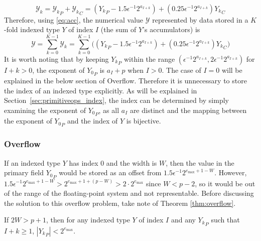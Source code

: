       \begin{equation}
        \mathcal{Y}_k = {\mathcal{Y}_k}_P + {\mathcal{Y}_k}_C = ({Y_k}_P - 1.5 \epsilon^{-1}2^{a_{I + k}}) + (0.25\epsilon^{-1}2^{a_{I + k}}){Y_k}_C
        \label{eq:acc}
      \end{equation}
      Therefore, using  \eqref{eq:acc}, the numerical value $\mathcal{Y}$ represented by data stored in a $K$-fold indexed type $Y$ of index $I$ (the sum of $Y$'s accumulators) is
      \begin{equation}
        \mathcal{Y} = \sum\limits_{k = 0}^{K - 1} \mathcal{Y}_k = \sum\limits_{k = 0}^{K - 1} \bigl(({Y_k}_P - 1.5 \epsilon^{-1}2^{a_{I + k}}) + (0.25\epsilon^{-1}2^{a_{I + k}}){Y_k}_C\bigr)
        \label{eq:indexedvalue}
      \end{equation}
      It is worth noting that by keeping ${Y_k}_P$ within the range
      \(
      	(\epsilon^{-1} 2^{a_{I + k}}, 2 \epsilon^{-1} 2^{a_{I + k}})
      \)
      for $I+k > 0$, the exponent of ${Y_0}_P$ is $a_I + p$ when $I > 0$.
      The case of $I = 0$ will be explained in the below section of Overflow.
      Therefore it is unnecessary to store the index of an indexed type explicitly.
      As will be explained in
      Section~\ref{sec:primitiveops_index}, the index can be determined by
      simply examining the exponent of ${Y_0}_P$, as all $a_I$ are distinct and
      the mapping between the exponent of ${Y_0}_P$ and the index of $Y$ is
      bijective.

    \subsubsection{Overflow}
      \label{sec:indexed_overflow}
      If an indexed type $Y$ has index 0 and the width is $W$, then the value
      in the primary field ${Y_0}_P$ would be stored as an offset from
      $1.5\epsilon^{-1}2^{e_{\max} + 1 - W}$. However,
      \(
        1.5\epsilon^{-1}2^{e_{\max} + 1 - W} > 2^{e_{\max} + 1 + (p - W)}
            > 2 \cdot 2^{e_{\max}}
      \) since $W < p - 2$, so it would be out of the range of the
      floating-point system and not representable. Before discussing the
      solution to this overflow problem, take note of Theorem
      \ref{thm:overflow}.

      \begin{samepage}
      \begin{thm}
        If $2 W > p + 1$, then for any indexed type $Y$ of index $I$ and any ${Y_k}_P$ such that $I + k \geq 1$, $|{Y_k}_P| < 2^{e_{\max}}$.
        \label{thm:overflow}
      \end{thm}
    \end{samepage}

